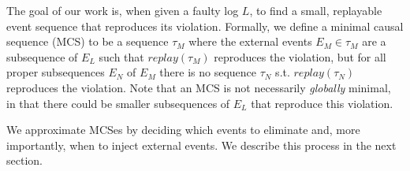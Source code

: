 The goal of our work is, when given a faulty log $L$, to find a small,
replayable event sequence that reproduces its
violation. Formally, we define a minimal causal sequence (MCS)
to be a sequence $\tau_M$ where the external events $E_M \in \tau_M$ are a
subsequence of $E_L$ such
that $replay(\tau_M)$ reproduces the violation, but for all proper
subsequences $E_N$ of $E_M$
there is no sequence $\tau_N$ s.t. $replay(\tau_N)$ reproduces the violation.
Note that an MCS is not necessarily {\em globally} minimal, in that there
could be smaller
subsequences of $E_L$ that reproduce this violation.%

We approximate MCSes by deciding
which events to eliminate and, more importantly, when to inject external
events. We describe this process in the next section.
